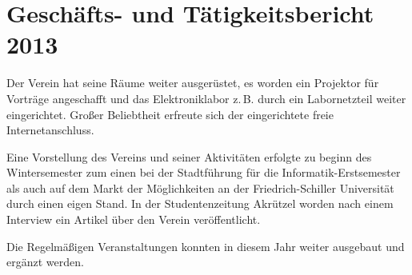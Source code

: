\documentclass[10pt, a4paper]{scrartcl}
\begin{document}
\section*{Geschäfts- und Tätigkeitsbericht 2013}
Der Verein hat seine Räume weiter ausgerüstet,
es worden ein Projektor für Vorträge angeschafft und
das Elektroniklabor z.\,B. durch ein Labornetzteil weiter eingerichtet.
Großer Beliebtheit erfreute sich der eingerichtete freie Internetanschluss.

Eine Vorstellung des Vereins und seiner Aktivitäten erfolgte zu beginn des Wintersemester
zum einen bei der Stadtführung für die Informatik-Erstsemester als auch
auf dem Markt der Möglichkeiten an der Friedrich-Schiller Universität durch einen eigen Stand.
In der Studentenzeitung Akrützel worden nach einem Interview ein Artikel über den Verein veröffentlicht.

Die Regelmäßigen Veranstaltungen konnten in diesem Jahr weiter ausgebaut und ergänzt werden.
\end{document}
